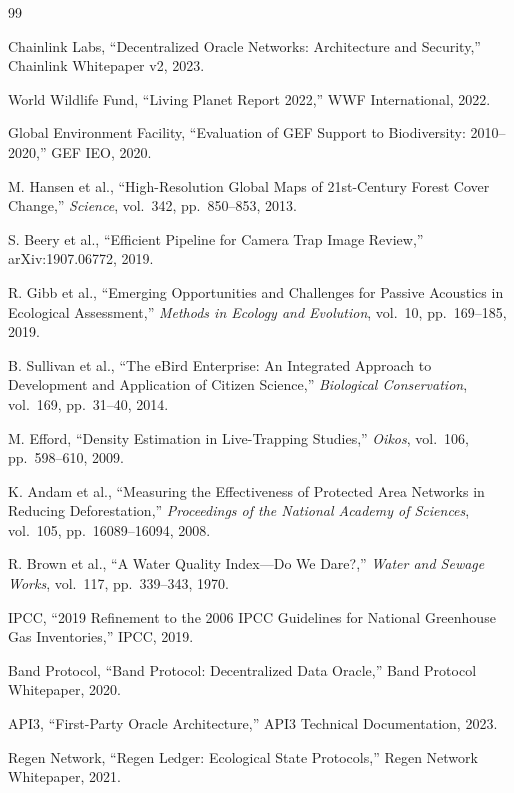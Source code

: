 \documentclass[11pt,letterpaper]{article}
\begin{document}

\begin{thebibliography}{99}

Chainlink Labs, ``Decentralized Oracle Networks: Architecture and Security,'' Chainlink Whitepaper v2, 2023.

World Wildlife Fund, ``Living Planet Report 2022,'' WWF International, 2022.

Global Environment Facility, ``Evaluation of GEF Support to Biodiversity: 2010--2020,'' GEF IEO, 2020.

M. Hansen et al., ``High-Resolution Global Maps of 21st-Century Forest Cover Change,'' \emph{Science}, vol.\ 342, pp.\ 850--853, 2013.

S. Beery et al., ``Efficient Pipeline for Camera Trap Image Review,'' arXiv:1907.06772, 2019.

R. Gibb et al., ``Emerging Opportunities and Challenges for Passive Acoustics in Ecological Assessment,'' \emph{Methods in Ecology and Evolution}, vol.\ 10, pp.\ 169--185, 2019.

B. Sullivan et al., ``The eBird Enterprise: An Integrated Approach to Development and Application of Citizen Science,'' \emph{Biological Conservation}, vol.\ 169, pp.\ 31--40, 2014.

M. Efford, ``Density Estimation in Live-Trapping Studies,'' \emph{Oikos}, vol.\ 106, pp.\ 598--610, 2009.

K. Andam et al., ``Measuring the Effectiveness of Protected Area Networks in Reducing Deforestation,'' \emph{Proceedings of the National Academy of Sciences}, vol.\ 105, pp.\ 16089--16094, 2008.

R. Brown et al., ``A Water Quality Index---Do We Dare?,'' \emph{Water and Sewage Works}, vol.\ 117, pp.\ 339--343, 1970.

IPCC, ``2019 Refinement to the 2006 IPCC Guidelines for National Greenhouse Gas Inventories,'' IPCC, 2019.

Band Protocol, ``Band Protocol: Decentralized Data Oracle,'' Band Protocol Whitepaper, 2020.

API3, ``First-Party Oracle Architecture,'' API3 Technical Documentation, 2023.

Regen Network, ``Regen Ledger: Ecological State Protocols,'' Regen Network Whitepaper, 2021.


\end{thebibliography}
\end{document}
